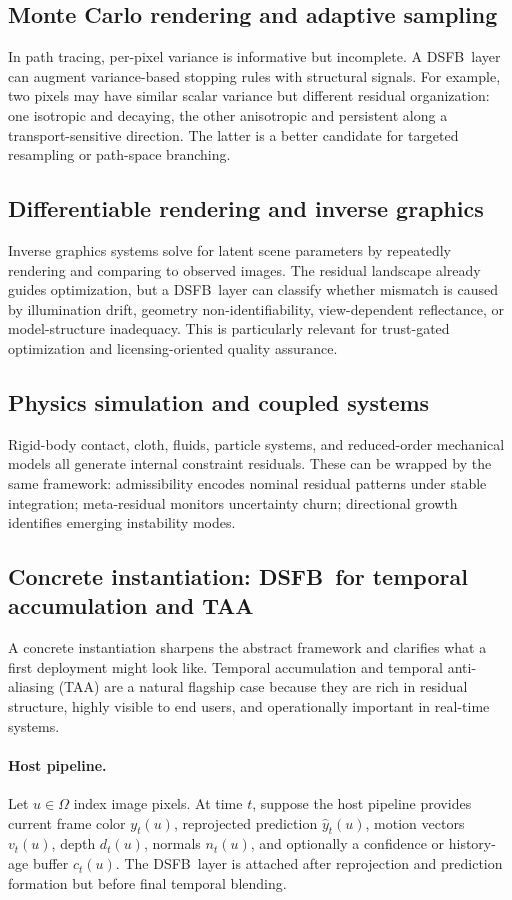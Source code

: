 \documentclass[11pt,letterpaper]{article}
\newcommand{\dsfb}{\textsc{DSFB}}
\theoremstyle{gcresult}
\theoremstyle{definition}
\begin{document}
\subsection{Monte Carlo rendering and adaptive sampling}
In path tracing, per-pixel variance is informative but incomplete. A \dsfb\ layer can augment variance-based stopping rules with structural signals. For example, two pixels may have similar scalar variance but different residual organization: one isotropic and decaying, the other anisotropic and persistent along a transport-sensitive direction. The latter is a better candidate for targeted resampling or path-space branching.

\subsection{Differentiable rendering and inverse graphics}
Inverse graphics systems solve for latent scene parameters by repeatedly rendering and comparing to observed images. The residual landscape already guides optimization, but a \dsfb\ layer can classify whether mismatch is caused by illumination drift, geometry non-identifiability, view-dependent reflectance, or model-structure inadequacy. This is particularly relevant for trust-gated optimization and licensing-oriented quality assurance.

\subsection{Physics simulation and coupled systems}
Rigid-body contact, cloth, fluids, particle systems, and reduced-order mechanical models all generate internal constraint residuals. These can be wrapped by the same framework: admissibility encodes nominal residual patterns under stable integration; meta-residual monitors uncertainty churn; directional growth identifies emerging instability modes.

\subsection{Concrete instantiation: \dsfb\ for temporal accumulation and TAA}
A concrete instantiation sharpens the abstract framework and clarifies what a first deployment might look like. Temporal accumulation and temporal anti-aliasing (TAA) are a natural flagship case because they are rich in residual structure, highly visible to end users, and operationally important in real-time systems.

\paragraph{Host pipeline.}
Let $u \in \Omega$ index image pixels. At time $t$, suppose the host pipeline provides current frame color $y_t(u)$, reprojected prediction $\hat y_t(u)$, motion vectors $v_t(u)$, depth $d_t(u)$, normals $n_t(u)$, and optionally a confidence or history-age buffer $c_t(u)$. The \dsfb\ layer is attached after reprojection and prediction formation but before final temporal blending.
\end{document}
